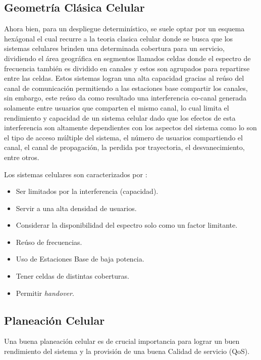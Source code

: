 \subsection{Geometría Clásica Celular}

Ahora bien, para un despliegue determinístico, se suele optar por un esquema hexágonal el cual recurre a la teoria clasica celular donde se busca que los sistemas celulares brinden una determinada cobertura para un servicio, dividiendo el área geográfica en segmentos llamados celdas donde el espectro de frecuencia también es dividido en canales y estos son agrupados para repartirse entre las celdas. Estos sistemas logran una alta capacidad gracias al reúso del canal de comunicación permitiendo a las estaciones base compartir los canales, sin embargo, este reúso da como resultado una interferencia co-canal generada solamente entre usuarios que comparten el mismo canal, lo cual limita el rendimiento y capacidad de un sistema celular dado que los efectos de esta interferencia son altamente dependientes con los aspectos del sistema \parencite{Tranter2003} como lo son el tipo de acceso múltiple del sistema, el número de usuarios compartiendo el canal, el canal de propagación, la perdida por trayectoria, el desvanecimiento, entre otros.\newline

Los sistemas celulares son caracterizados por \parencite{Correia2018}:
\begin{itemize}
    \item Ser limitados por la interferencia (capacidad).
    \item Servir a una alta densidad de usuarios.
    \item Considerar la disponibilidad del espectro solo como un factor limitante.
    \item Reúso de frecuencias.
    \item Uso de Estaciones Base de baja potencia.
    \item Tener celdas de distintas coberturas.
    \item Permitir \textit{handover}.
\end{itemize}

\subsection{Planeación Celular}

Una buena planeación celular es de crucial importancia para lograr un buen rendimiento del sistema y la provisión de una buena Calidad de servicio (QoS).\newline

